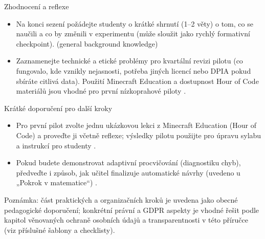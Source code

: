 Zhodnocení a reflexe
\begin{itemize}
  \item Na konci sezení požádejte studenty o krátké shrnutí (1--2 věty) o tom, co se naučili a co by změnili v experimentu (může sloužit jako rychlý formativní checkpoint). (general background knowledge)
  \item Zaznamenejte technické a etické problémy pro kvartální revizi pilotu (co fungovalo, kde vznikly nejasnosti, potřeba jiných licencí nebo DPIA pokud sbíráte citlivá data). Použití Minecraft Education a dostupnost Hour of Code materiálů jsou vhodné pro první nízkoprahové piloty \cite{kb_ai_101_tipu_pdf_04e4a115_page_15_2}.
\end{itemize}

Krátké doporučení pro další kroky
\begin{itemize}
  \item Pro první pilot zvolte jednu ukázkovou lekci z Minecraft Education (Hour of Code) a proveďte ji včetně reflexe; výsledky pilotu použijte pro úpravu sylabu a instrukcí pro studenty \cite{kb_ai_101_tipu_pdf_04e4a115_page_15_2}.
  \item Pokud budete demonstrovat adaptivní procvičování (diagnostiku chyb), předveďte i způsob, jak učitel finalizuje automatické návrhy (uvedeno u „Pokrok v matematice“) \cite{kb_ai_101_tipu_pdf_04e4a115_page_8_1}.
\end{itemize}

Poznámka: část praktických a organizačních kroků je uvedena jako obecné pedagogické doporučení; konkrétní právní a GDPR aspekty je vhodné řešit podle kapitol věnovaných ochraně osobních údajů a transparentnosti v této příručce (viz příslušné šablony a checklisty).